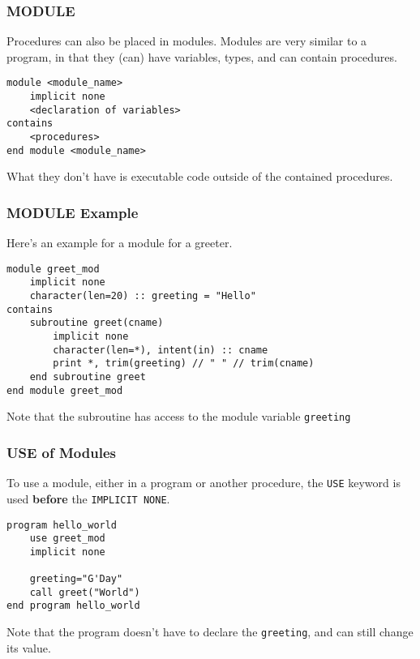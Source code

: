 \begin{frame}[fragile]
  \frametitle{MODULE}

  Procedures can also be placed in modules. 
  Modules are very similar to a program, in that they (can) have 
  variables, types, and can contain procedures.

  \begin{lstlisting}
module <module_name>
    implicit none
    <declaration of variables>
contains
    <procedures>
end module <module_name>
  \end{lstlisting}

  What they don't have is executable code outside of the contained
  procedures.

\end{frame}

\begin{frame}[fragile]
  \frametitle{MODULE Example}

  Here's an example for a module for a greeter.

  \begin{lstlisting}
module greet_mod
    implicit none
    character(len=20) :: greeting = "Hello"
contains
    subroutine greet(cname)
        implicit none
        character(len=*), intent(in) :: cname
        print *, trim(greeting) // " " // trim(cname)
    end subroutine greet
end module greet_mod
  \end{lstlisting}

  Note that the subroutine has access to the module variable \texttt{greeting}

\end{frame}

\begin{frame}[fragile]
  \frametitle{USE of Modules}

  To use a module, either in a program or another procedure, 
  the \texttt{USE} keyword is used \textbf{before} the \texttt{IMPLICIT NONE}.

  \begin{lstlisting}
program hello_world
    use greet_mod
    implicit none

    greeting="G'Day"
    call greet("World")
end program hello_world
  \end{lstlisting}

  Note that the program doesn't have to declare the \texttt{greeting}, 
  and can still change its value.

\end{frame}
